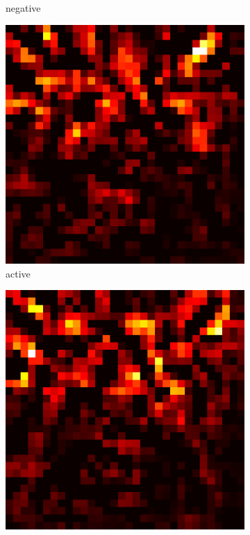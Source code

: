\documentclass[preprint,12pt]{elsarticle}
\begin{document}
\begin{figure}
\begin{subfigure}{0.14\textwidth}
        \caption{negative}
    \end{subfigure}
    \hfill
    \begin{subfigure}{0.14\textwidth}
        \centering
        \includegraphics[width=\linewidth]{../visualizations/examples/cifar10/cnn/active_saliency_map/5.png}
        \caption{active}
    \end{subfigure}
    \hfill
    \begin{subfigure}{0.14\textwidth}
        \centering
        \includegraphics[width=\linewidth]{../visualizations/examples/cifar10/cnn/inactive_saliency_map/5.png}

\end{subfigure}
\end{figure}
\end{document}
